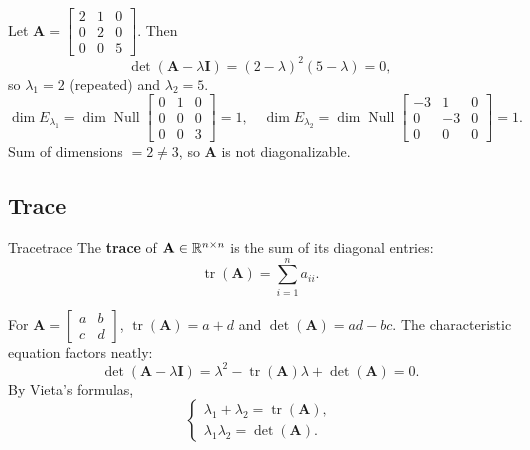 \begin{example}
  Let $\mathbf{A} =
    \begin{bmatrix}
      2 & 1 & 0 \\
      0 & 2 & 0 \\
      0 & 0 & 5
    \end{bmatrix}
  $. Then
  \[
    \det(\mathbf{A} - \lambda \mathbf{I}) = (2 - \lambda)^2 (5 - \lambda) = 0,
  \]
  so $\lambda_1 = 2$ (repeated) and $\lambda_2 = 5$.
  \[
    \dim E_{\lambda_1} = \dim \operatorname{Null}
    \begin{bmatrix}
      0 & 1 & 0 \\
      0 & 0 & 0 \\
      0 & 0 & 3
    \end{bmatrix}
    = 1,
    \quad
    \dim E_{\lambda_2} = \dim \operatorname{Null}
    \begin{bmatrix}
      -3 & 1  & 0 \\
      0  & -3 & 0 \\
      0  & 0  & 0
    \end{bmatrix}
    = 1.
  \]
  Sum of dimensions $= 2 \neq 3$, so $\mathbf{A}$ is not diagonalizable.
\end{example}

\subsection{Trace}

\begin{definition}{Trace}{trace}
  The \textbf{trace} of $\mathbf{A} \in \mathbb{R}^{n \times n}$ is the sum of its diagonal entries:
  \[
    \operatorname{tr}(\mathbf{A}) = \sum_{i=1}^{n} a_{ii}.
  \]
\end{definition}

For $\mathbf{A} =
  \begin{bmatrix}
    a & b \\ c & d
  \end{bmatrix}
$, $\operatorname{tr}(\mathbf{A}) = a + d$ and $\det(\mathbf{A}) = ad - bc$. The characteristic equation factors neatly:
\[
  \det(\mathbf{A} - \lambda \mathbf{I}) = \lambda^2 - \operatorname{tr}(\mathbf{A})\lambda + \det(\mathbf{A}) = 0.
\]
By Vieta's formulas,
\[
  \begin{cases}
    \lambda_1 + \lambda_2 = \operatorname{tr}(\mathbf{A}), \\
    \lambda_1 \lambda_2 = \det(\mathbf{A}).
  \end{cases}
\]

